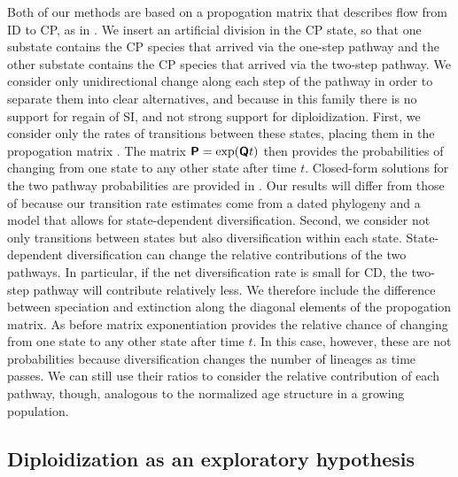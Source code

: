 Both of our methods are based on a propogation matrix that describes flow from ID to CP, as in \citet{robertson_2011}.
We insert an artificial division in the CP state, so that one substate contains the CP species that arrived via the one-step pathway and the other substate contains the CP species that arrived via the two-step pathway.
We consider only unidirectional change along each step of the pathway in order to separate them into clear alternatives, and because in this family there is no support for regain of SI, and not strong support for diploidization.
First, we consider only the rates of transitions between these states, placing them in the propogation matrix .
The matrix $\bm{\mathsf{P}} = \exp(\bm{\mathsf{Q}} t)$ then provides the probabilities of changing from one state to any other state after time $t$.
Closed-form solutions for the two pathway probabilities are provided in \citet{robertson_2011}.
Our results will differ from those of \citet{robertson_2011} because our transition rate estimates come from a dated phylogeny and a model that allows for state-dependent diversification.
%
Second, we consider not only transitions between states but also diversification within each state.
State-dependent diversification can change the relative contributions of the two pathways.
In particular, if the net diversification rate is small for CD, the two-step pathway will contribute relatively less.
We therefore include the difference between speciation and extinction along the diagonal elements of the propogation matrix.
As before matrix exponentiation provides the relative chance of changing from one state to any other state after time $t$.
In this case, however, these are not probabilities because diversification changes the number of lineages as time passes.
We can still use their ratios to consider the relative contribution of each pathway, though, analogous to the normalized age structure in a growing population.



\subsection{Diploidization as an exploratory hypothesis}

